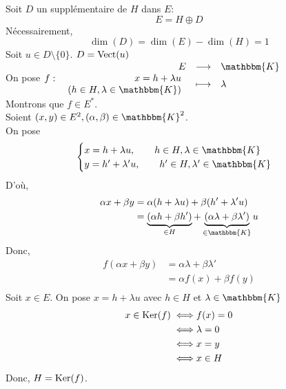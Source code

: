 \begin{prv}
	Soit $D$ un supplémentaire de $H$ dans $E$: \[
		E = H \oplus D
	\]
	Nécessairement, \[
		\dim(D) = \dim(E) - \dim(H) = 1
	\]
	Soit $u \in D \setminus \{0\}$.  $D = \operatorname{Vect}(u)$\\
	On pose $f : \begin{array}{rcl}
		E &\longrightarrow& \mathbbm{K} \\
		\begin{array}{r}
			\fontsize{5pt}{5pt}\selectfont
			x = h + \lambda u\\
			(h \in H, \lambda \in \mathbbm{K})
		\end{array} &\longmapsto& \lambda
	\end{array}$\\
	Montrons que $f \in E^*$.\\
	Soient $(x,y) \in E^2, (\alpha, \beta) \in \mathbbm{K}^2$.\\
	On pose \[
		\begin{cases}
			x = h + \lambda u, \qquad h \in H, \lambda \in \mathbbm{K}\\
			y = h' + \lambda' u, \qquad h' \in H, \lambda' \in \mathbbm{K}\\
		\end{cases}
	\] D'où,
	\begin{align*}
		\alpha x + \beta y &=  \alpha (h + \lambda u) + \beta (h' + \lambda'u) \\
		&= \underbrace{(\alpha h + \beta h')}_{\in H} + \underbrace{(\alpha \lambda + \beta \lambda')}_{\in \mathbbm{K}} u \\
	\end{align*}
	Donc,
	\begin{align*}
		f(\alpha x + \beta y) &= \alpha \lambda + \beta \lambda' \\
		&= \alpha f(x) + \beta f(y) \\
	\end{align*}
	Soit $x \in E$. On pose $x = h + \lambda u$ avec $h \in H$ et $\lambda \in \mathbbm{K}$ \\
	\begin{align*}
		x \in \operatorname{Ker}(f) \iff& f(x) = 0\\
		\iff& \lambda = 0\\
		\iff& x = y\\
		\iff& x \in H
	\end{align*}
	Donc, $H = \operatorname{Ker}(f)$.\\
\end{prv}

